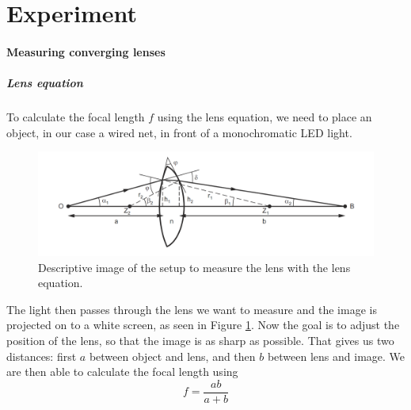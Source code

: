 \section{Experiment}

\paragraph{Measuring converging lenses}
\subparagraph{Lens equation}
\label{chap::lens}

To calculate the focal length $f$ using the lens equation, we need to place an object, in our case a wired net, in front of a monochromatic LED light. 

\begin{figure}[ht]
	\centering
	\includegraphics[width=\textwidth]{img/lenseq.PNG}
	\caption{Descriptive image\cite{manual} of the setup to measure the lens with the lens equation.}
	\label{fig::lens}
\end{figure}

The light then passes through the lens we want to measure and the image is projected on to a white screen, as seen in Figure \ref{fig::lens}.
Now the goal is to adjust the position of the lens, so that the image is as sharp as possible.
That gives us two distances:
first $a$ between object and lens, and then $b$ between lens and image.
We are then able to calculate the focal length using
\begin{equation}
	\displaystyle f = \frac{ab}{a+b}
\end{equation}






